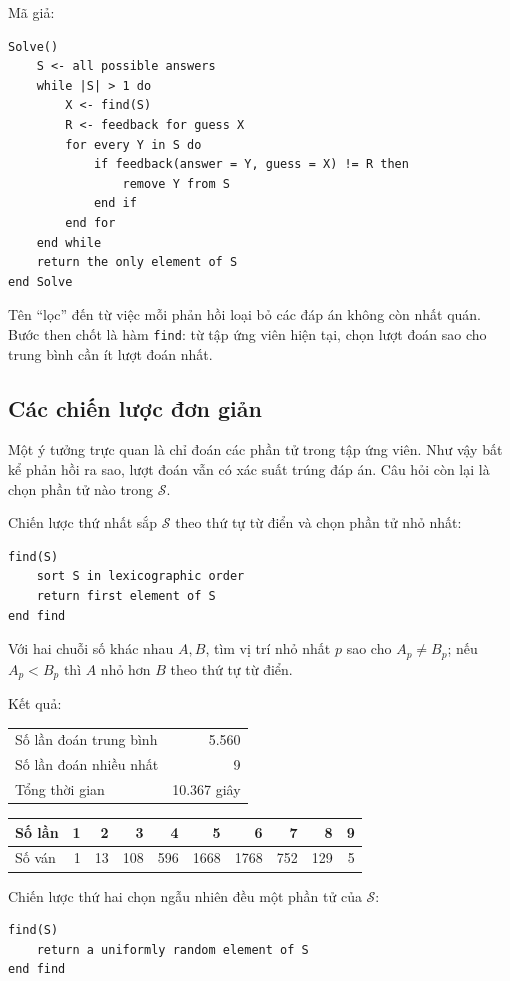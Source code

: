 \documentclass[11pt]{article}
\newcommand{\SetS}{\mathcal{S}}
\begin{document}
Mã giả:
\begin{verbatim}
Solve()
    S <- all possible answers
    while |S| > 1 do
        X <- find(S)
        R <- feedback for guess X
        for every Y in S do
            if feedback(answer = Y, guess = X) != R then
                remove Y from S
            end if
        end for
    end while
    return the only element of S
end Solve
\end{verbatim}

Tên ``lọc'' đến từ việc mỗi phản hồi loại bỏ các đáp án không còn nhất quán.
Bước then chốt là hàm \texttt{find}: từ tập ứng viên hiện tại, chọn lượt đoán
sao cho trung bình cần ít lượt đoán nhất.

\subsection{Các chiến lược đơn giản}

Một ý tưởng trực quan là chỉ đoán các phần tử trong tập ứng viên. Như vậy bất
kể phản hồi ra sao, lượt đoán vẫn có xác suất trúng đáp án. Câu hỏi còn lại
là chọn phần tử nào trong \(\SetS\).

Chiến lược thứ nhất sắp \(\SetS\) theo thứ tự từ điển và chọn phần tử nhỏ
nhất:
\begin{verbatim}
find(S)
    sort S in lexicographic order
    return first element of S
end find
\end{verbatim}
Với hai chuỗi số khác nhau \(A,B\), tìm vị trí nhỏ nhất \(p\) sao cho
\(A_p\ne B_p\); nếu \(A_p<B_p\) thì \(A\) nhỏ hơn \(B\) theo thứ tự từ điển.

Kết quả:
\begin{center}
\small
\begin{tabular}{|l|r|}
\hline
Số lần đoán trung bình & 5.560 \\
Số lần đoán nhiều nhất & 9 \\
Tổng thời gian & 10.367 giây \\
\hline
\end{tabular}

\medskip
\begin{tabular}{|l|rrrrrrrrr|}
\hline
Số lần & 1 & 2 & 3 & 4 & 5 & 6 & 7 & 8 & 9 \\
\hline
Số ván & 1 & 13 & 108 & 596 & 1668 & 1768 & 752 & 129 & 5 \\
\hline
\end{tabular}
\end{center}

Chiến lược thứ hai chọn ngẫu nhiên đều một phần tử của \(\SetS\):
\begin{verbatim}
find(S)
    return a uniformly random element of S
end find
\end{verbatim}
\end{document}

